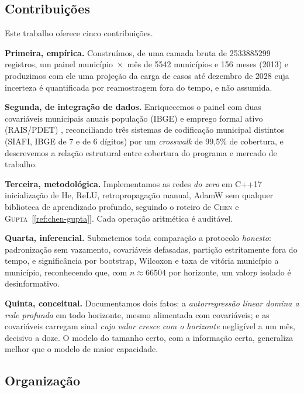 \documentclass[12pt,a4paper,oneside]{article}
\newcommand{\C}[1]{[\ref{#1}]}
\begin{document}
\subsection{Contribuições}

Este trabalho oferece cinco contribuições.

\textbf{Primeira, empírica.} Construímos, de uma camada bruta de
\num{2533885299} registros, um painel município~$\times$~mês de
\num{5542} municípios e 156 meses (2013) e produzimos com
ele uma projeção da carga de casos até dezembro de 2028 cuja incerteza é
quantificada por reamostragem fora do tempo, e não assumida.

\textbf{Segunda, de integração de dados.} Enriquecemos o painel com duas
covariáveis municipais anuais \textemdash{} população (IBGE) e emprego
formal ativo (RAIS/PDET) \textemdash{}, reconciliando três sistemas de
codificação municipal distintos (SIAFI, IBGE de 7 e de 6 dígitos) por um
\emph{crosswalk} de 99,5\% de cobertura, e descrevemos a relação
estrutural entre cobertura do programa e mercado de trabalho.

\textbf{Terceira, metodológica.} Implementamos as redes \emph{do zero} em
C++17 \textemdash{} inicialização de He, ReLU, retropropagação manual,
AdamW \textemdash{} sem qualquer biblioteca de aprendizado profundo,
seguindo o roteiro de \textsc{Chen} e \textsc{Gupta}~\C{ref:chen-gupta}.
Cada operação aritmética é auditável.

\textbf{Quarta, inferencial.} Submetemos toda comparação a protocolo
\emph{honesto}: padronização sem vazamento, covariáveis defasadas,
partição estritamente fora do tempo, e significância por bootstrap,
Wilcoxon e taxa de vitória município a município, reconhecendo que, com
$n\approx\num{66504}$ por horizonte, um valor\-$p$ isolado é
desinformativo.

\textbf{Quinta, conceitual.} Documentamos dois fatos: a \emph{autorregressão
linear domina a rede profunda} em todo horizonte, mesmo alimentada com
covariáveis; e as covariáveis carregam sinal \emph{cujo valor cresce com o
horizonte} \textemdash{} negligível a um mês, decisivo a doze. O modelo do
tamanho certo, com a informação certa, generaliza melhor que o modelo de
maior capacidade.

\subsection{Organização}
\end{document}
